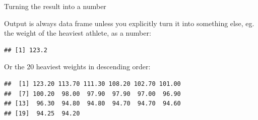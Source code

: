 \documentclass[
  ignorenonframetext,
]{beamer}
\newenvironment{Shaded}{\begin{snugshade}}{\end{snugshade}}
\newcommand{\DecValTok}[1]{\textcolor[rgb]{0.00,0.00,0.81}{#1}}
\newcommand{\KeywordTok}[1]{\textcolor[rgb]{0.13,0.29,0.53}{\textbf{#1}}}
\newcommand{\NormalTok}[1]{#1}
\newcommand{\OperatorTok}[1]{\textcolor[rgb]{0.81,0.36,0.00}{\textbf{#1}}}
\newcommand{\StringTok}[1]{\textcolor[rgb]{0.31,0.60,0.02}{#1}}
\begin{document}
\begin{frame}[fragile]{Turning the result into a number}
\protect\hypertarget{turning-the-result-into-a-number}{}

Output is always data frame unless you explicitly turn it into something
else, eg. the weight of the heaviest athlete, as a number:

\begin{Shaded}
\end{Shaded}

\begin{verbatim}
## [1] 123.2
\end{verbatim}

Or the 20 heaviest weights in descending order:

\begin{Shaded}
\end{Shaded}

\begin{verbatim}
##  [1] 123.20 113.70 111.30 108.20 102.70 101.00
##  [7] 100.20  98.00  97.90  97.90  97.00  96.90
## [13]  96.30  94.80  94.80  94.70  94.70  94.60
## [19]  94.25  94.20
\end{verbatim}

\end{frame}
\end{document}
